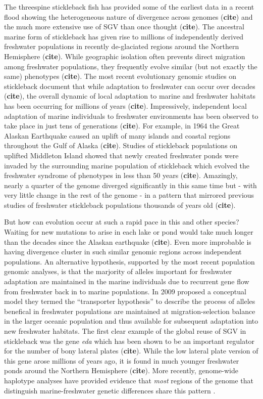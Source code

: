 \documentclass{article}
\begin{document}
The threespine stickleback fish has provided some of the earliest data in a recent flood showing the heterogeneous nature of divergence across genomes (\textbf{cite}) and the much more extensive use of SGV than once thought (\textbf{cite}). The ancestral marine form of stickleback has given rise to millions of independently derived freshwater populations in recently de-glaciated regions around the Northern Hemisphere (\textbf{cite}). While geographic isolation often prevents direct migration among freshwater populations, they frequently evolve similar (but not exactly the same) phenotypes (\textbf{cite}). The most recent evolutionary genomic studies on stickleback document that while adaptation to freshwater can occur over decades (\textbf{cite}), the overall dynamic of local adaptation to marine and freshwater habitats has been occurring for millions of years (\textbf{cite}). Impressively, independent local adaptation of marine individuals to freshwater environments has been observed to take place in just tens of generations (\textbf{cite}). For example, in 1964 the Great Alaskan Earthquake caused an uplift of many islands and coastal regions throughout the Gulf of Alaska (\textbf{cite}). Studies of stickleback populations on uplifted Middleton Island showed that newly created freshwater ponds were invaded by the surrounding marine population of stickleback which evolved the freshwater syndrome of phenotypes in less than 50 years (\textbf{cite}). Amazingly, nearly a quarter of the genome diverged significantly in this same time but - with very little change in the rest of the genome - in a pattern that mirrored previous studies of freshwater stickleback populations thousands of years old (\textbf{cite}). 

But how can evolution occur at such a rapid pace in this and other species? Waiting for new mutations to arise in each lake or pond would take much longer than the decades since the Alaskan earthquake (\textbf{cite}). Even more improbable is having divergence cluster in such similar genomic regions across independent populations. An alternative hypothesis, supported by the most recent population genomic analyses, is that the marjority of alleles important for freshwater adaptation are maintained in the marine individuals due to recurrent gene flow from freshwater back in to marine populations. In 2009 \citet{schluter2009genetics} proposed a conceptual model they termed the ``transporter hypothesis'' to describe the process of alleles benefical in freshwater populations are maintained at migration-selection balance in the larger oceanic population and thus available for subsequent adaptation into new freshwater habitats. The first clear example of the global reuse of SGV in stickleback was the gene \textit{eda} which has been shown to be an important regulator for the number of bony lateral plates (\textbf{cite}). While the low lateral plate version of this gene arose millions of years ago, it is found in much younger freshwater ponds around the Northern Hemisphere (\textbf{cite}). More recently, genome-wide haplotype analyses have provided evidence that \textit{most} regions of the genome that distinguish marine-freshwater genetic differences share this pattern \citep{nelson2017ancient}. 
\end{document}
